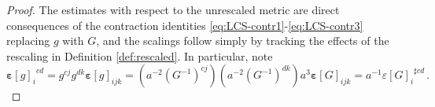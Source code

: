 \documentclass[11pt,leqno,textwidth=10cm]{amsart}
\numberwithin{equation}{section}
\theoremstyle{definition}
\theoremstyle{plain}
\newcommand{\1}{\mathbbm{1}}
\newcommand{\I}{\mathbb{I}}
\renewcommand{\epsilon}{\varepsilon}
\newcommand{\epsilonLC}{\bm{\epsilon}}
\newcommand{\change}[1]{\color{black}#1\color{black}}
\begin{document}
\begin{proof} The estimates with respect to the unrescaled metric are direct consequences of the contraction identities \eqref{eq:LCS-contr1}-\eqref{eq:LCS-contr3} \change{replacing $g$ with $G$}, and \change{the scalings }follow simply by tracking the effects of the rescaling in Definition \ref{def:rescaled}. In particular, note
\begin{equation}\label{eq:epsilonLC-resc}
{\epsilonLC[g]_{i}}^{cd}=g^{cj}g^{dk}\epsilonLC[g]_{ijk}=\left(a^{-2} (G^{-1})^{cj}\right)\left(a^{-2} (G^{-1})^{dk}\right)a^3\epsilonLC[G]_{ijk}=a^{-1}{\epsilon[G]_{i}}^{\sharp cd}\,.
\end{equation}
%

\end{proof}
\end{document}
